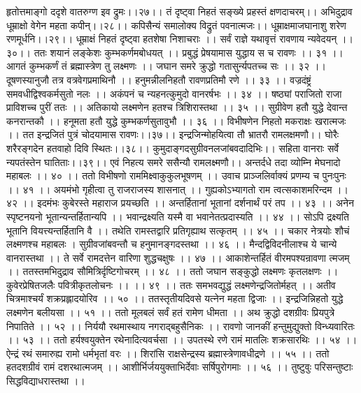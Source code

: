 हृतोत्तमाङ्गो ददृशे वातरुग्ण इव द्रुमः।।२७।।
तं दृष्ट्वा निहतं सङ्ख्ये प्रहस्तं क्षणदाचरम्।।
अभिदुद्राव धूम्राक्षो वेगेन महता कपीन्।।२८।।
कपिसैन्यं समालोक्य विद्रुतं पवनात्मजः।।
धूम्राक्षमाजघानाशु शरेण रणमूर्धनि।।२९।।
धूम्राक्षं निहतं दृष्ट्वा हतशेषा निशाचराः ।।
सर्वं राज्ञे यथावृत्तं रावणाय न्यवेदयन् ।।३०।।
ततः शयानं लङ्केशः कुम्भकर्णमबोधयत् ।।
प्रबुद्धं प्रेषयामास युद्धाय स च रावणः ।। ३१ ।।
आगतं कुम्भकर्णं तं ब्रह्मास्त्रेण तु लक्ष्मणः ।।
जघान समरे क्रुद्धो गतासुर्न्यपतच्च सः ।। ३२ ।।
दूषणस्यानुजौ तत्र वत्रवेगप्रमाथिनौ ।।
हनुमन्नीलनिहतौ रावणप्रतिमौ रणे ।। ३३ ।।
वज्रदंष्ट्रं समवधीद्विश्वकर्मसुतो नलः ।।
अकंपनं च न्यहनत्कुमुदो वानरर्षभः ।। ३४ ।।
षष्ठ्यां पराजितो राजा प्राविशच्च पुरीं ततः ।।
अतिकायो लक्ष्मणेन हतश्च त्रिशिरास्तथा ।। ३५ ।।
सुग्रीवेण हतौ युद्धे देवान्त कनरान्तकौ ।।
हनूमता हतौ युद्धे कुम्भकर्णसुतावुभौ ।। ३६ ।।
विभीषणेन निहतो मकराक्षः खरात्मजः ।।
तत इन्द्रजितं पुत्रं चोदयामास रावणः।।३७।।
इन्द्रजिन्मोहयित्वा तौ भ्रातरौ रामलक्षमणौ।।
घोरैः शरैरङ्गदेन हतवाहो दिवि स्थितः।।३८।।
कुमुदाङ्गदसुग्रीवनलजांबवदादिभिः।।
सहिता वानराः सर्वे न्यपतंस्तेन घातिताः।।३९।।
एवं निहत्य समरे ससैन्यौ रामलक्ष्मणौ।।
अन्तर्दधे तदा व्योम्नि मेघनादो महाबलः ।। ४० ।।
ततो विभीषणो राममिक्ष्वाकुकुलभूषणम् ।।
उवाच प्राञ्जलिर्वाक्यं प्रणम्य च पुनःपुनः ।। ४१ ।।
अयमंभो गृहीत्वा तु राजराजस्य शासनात् ।।
गुह्यकोऽभ्यागतो राम त्वत्सकाशमरिन्दम ।। ४२ ।।
इदमंभः कुबेरस्ते महाराज प्रयच्छति ।।
अन्तर्हितानां भूतानां दर्शनार्थं परं तप ।। ४३ ।।
अनेन स्पृष्टनयनो भूतान्यन्तर्हितान्यपि ।।
भवान्द्रक्ष्यति यस्मै वा भवानेतत्प्रदास्यति ।। ४४ ।।
सोऽपि द्रक्ष्यति भूतानि वियत्त्यन्तर्हितानि वै ।।
तथेति रामस्तद्वारि प्रतिगृह्याथ सत्कृतम् ।। ४५ ।।
चकार नेत्रयोः शौचं लक्ष्मणश्च महाबलः ।
सुग्रीवजांबवन्तौ च हनुमानङ्गदस्तथा ।। ४६ ।।
मैन्दद्विविदनीलाश्च ये चान्ये वानरास्तथा ।।
ते सर्वे रामदत्तेन वारिणा शुद्धचक्षुषः ।। ४७ ।।
आकाशेन्तर्हितं वीरमपश्यन्रावणा त्मजम् ।।
ततस्तमभिदुद्राव सौमित्रिर्दृष्टिगोचरम् ।। ४८ ।।
ततो जघान सङ्कुद्धो लक्ष्मणः कृतलक्षणः ।।
कुवेरप्रेषितजलैः पवित्रीकृतलोचनः ।। ।। ४९ ।।
ततः समभवद्युद्धं लक्ष्मणेन्द्रजितोर्महत् ।।
अतीव चित्रमाश्चर्यं शक्रप्रह्लादयोरिव ।। ५० ।।
ततस्तृतीयदिवसे यत्नेन महता द्विजाः ।।
इन्द्रजिन्निहतो युद्धे लक्ष्मणेन बलीयसा ।। ५१ ।।
ततो मूलबलं सर्वं हतं रामेण धीमता ।।
अथ क्रुद्धो दशग्रीवः प्रियपुत्रे निपातिते ।। ५२ ।।
निर्ययौ रथमास्थाय नगराद्बहुसैनिकः ।।
रावणो जानकीं हन्तुमुद्युक्तो विन्ध्यवारितः ।। ५३ ।।
ततो हर्यश्वयुक्तेन रथेनादित्यवर्चसा ।।
उपतस्थे रणे रामं मातलिः शक्रसारथिः ।। ५४ ।।
ऐन्द्रं रथं समारुह्य रामो धर्मभृतां वरः ।।
शिरांसि राक्षसेन्द्रस्य ब्रह्मास्त्रेणावधीद्रणे ।। ५५ ।।
ततो हतदशग्रीवं रामं दशरथात्मजम् ।।
आशीर्भिर्जययुक्ताभिर्देवाः सर्षिपुरोगमाः ।। ५६ ।।
तुष्टुवुः परिसन्तुष्टाः सिद्धविद्याधरास्तथा ।।
